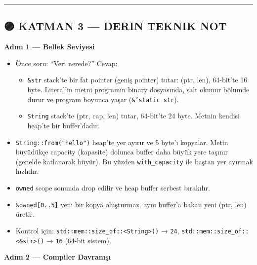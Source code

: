 \documentclass[12pt,a4paper]{article}
\begin{document}
\begin{center}\rule{0.5\linewidth}{0.5pt}\end{center}

\subsection{🟣 KATMAN 3 --- DERIN TEKNIK NOT}\label{katman-3-—-derin-teknik-not-5}

\textbf{Adım 1 --- Bellek Seviyesi}

\begin{itemize}
\tightlist
\item
  Önce soru: ``Veri nerede?'' Cevap:

  \begin{itemize}
  \tightlist
  \item
    \texttt{\&str} stack'te bir fat pointer (geniş pointer) tutar: (ptr, len), 64-bit'te 16 byte. Literal'in metni programın binary dosyasında, salt okunur bölümde durur ve program boyunca yaşar (\texttt{\&'static\ str}).
  \item
    \texttt{String} stack'te (ptr, cap, len) tutar, 64-bit'te 24 byte. Metnin kendisi heap'te bir buffer'dadır.
  \end{itemize}
\item
  \texttt{String::from("hello")} heap'te yer ayırır ve 5 byte'ı kopyalar. Metin büyüdükçe capacity (kapasite) dolunca buffer daha büyük yere taşınır (genelde katlanarak büyür). Bu yüzden \texttt{with\_capacity} ile baştan yer ayırmak hızlıdır.
\item
  \texttt{owned} scope sonunda drop edilir ve heap buffer serbest bırakılır.
\item
  \texttt{\&owned{[}0..5{]}} yeni bir kopya oluşturmaz, aynı buffer'a bakan yeni (ptr, len) üretir.
\item
  Kontrol için: \texttt{std::mem::size\_of::\textless{}String\textgreater{}()} → \texttt{24}, \texttt{std::mem::size\_of::\textless{}\&str\textgreater{}()} → \texttt{16} (64-bit sistem).
\end{itemize}

\textbf{Adım 2 --- Compiler Davranışı}
\end{document}
